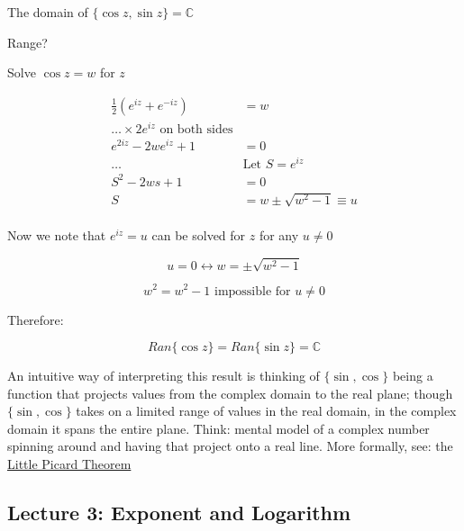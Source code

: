 \documentclass[../notes.tex]{subfiles}
\begin{document}
The domain of $ \{ \cos z, \sin z\} = \mathbb{C} $ 

Range?

Solve $ \cos z = w $  for $ z $ 

\begin{equation}
	\begin{split}
		\frac{1}{2} (e^{iz} + e^{-iz}) &= w \\
		\ldots \times   2e^{iz} \text{ on both sides}\\
		e^{2iz} - 2we^{iz} + 1 &= 0  \\
		\ldots & \text{Let } S = e^{iz} \\
		S^2 - 2ws + 1 &= 0 \\
		S &= w \pm \sqrt{w^2 - 1} \equiv u  \\
	\end{split}
\end{equation}

Now we note that $ e^{iz} = u $  can be solved for $ z $  for any $ u \neq  0$ 

\begin{equation}
	u = 0 \leftrightarrow w = \pm \sqrt{w^2 - 1} 
\end{equation}

\begin{equation}
	w^2 = w^2 - 1 \text{ impossible for } u \neq 0 
\end{equation}

Therefore:

\begin{equation}
	Ran\{\cos z\}=
	Ran\{\sin z\} = \mathbb{C}
\end{equation}

\begin{remark}
	An intuitive way of interpreting this result is thinking of $ \{\sin, \cos \} $ being a function that projects values from the complex domain to the real plane; though $ \{\sin, \cos \} $ takes on a limited range of values in the real domain, in the complex domain it spans the entire plane. Think: mental model of a complex number spinning around and having that project onto a real line. More formally, see: the \href{https://en.wikipedia.org/wiki/Picard_theorem}{Little Picard Theorem}
\end{remark}


\subsection{Lecture 3: Exponent and Logarithm}
\end{document}

